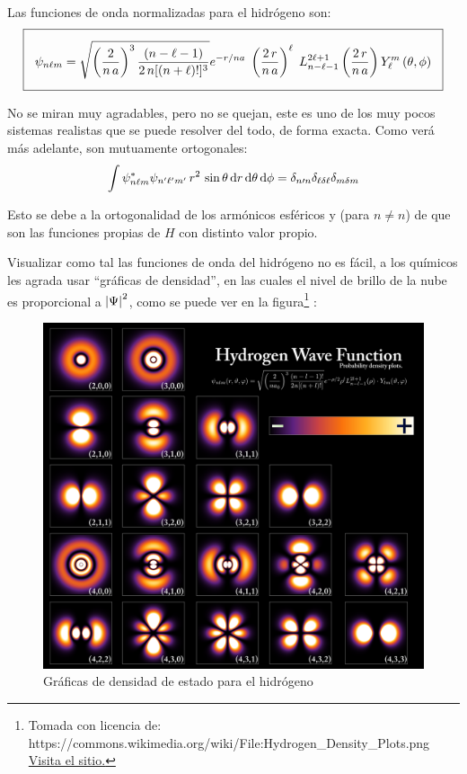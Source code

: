 Las funciones de onda normalizadas para el hidrógeno son:
\begin{align}
\setlength{\fboxsep}{3\fboxsep}\boxed{
\psi_{n \ell m} = \sqrt{\left(\dfrac{2}{n \, a} \right)^{3} \dfrac{(n - \ell - 1)}{2 \, n[(n + \ell)!]^{3}}} e^{-r/na} \; \left( \dfrac{2 \, r}{n \, a} \right)^{\ell} \; L_{n - \ell -1}^{2 \ell + 1} \left( \dfrac{2 \, r}{n \, a} \right) Y_{\ell}^{m} \, (\theta, \phi)}
\label{eq:ecuacion_04_89}
\end{align}

No se miran muy agradables, pero no se quejan, este es uno de los muy pocos sistemas realistas que se puede resolver del todo, de forma exacta. Como verá más adelante, son mutuamente ortogonales:
\begin{align}
\int \psi_{n \ell m}^{*} \psi_{{n}^{\prime} {\ell}^{\prime} {m}^{\prime}} \, r^{2} \, \sin \theta \dd{r} \dd{\theta} \dd{\phi} =  \delta_{n \prime{n}} \delta_{\ell \delta{\ell}} \delta_{m \delta{m}}
\label{eq:ecuacion_04_90}
\end{align}

Esto se debe a la ortogonalidad de los armónicos esféricos y (para $n \neq n$) de que son las funciones propias de $H$ con distinto valor propio.
\par
Visualizar como tal las funciones de onda del hidrógeno no es fácil, a los químicos les agrada usar \enquote{gráficas de densidad}, en las cuales el nivel de brillo de la nube es proporcional a $\abs{\Psi}^{2}$, como se puede ver en la figura\footnote{Tomada con licencia de: https://commons.wikimedia.org/wiki/File:Hydrogen_Density_Plots.png  \href{https://commons.wikimedia.org/wiki/File:Hydrogen_Density_Plots.png}{Visita el sitio.}} :
\begin{figure}[H]
    \centering
    \includegraphics[scale=0.15]{Imagenes/Hydrogen_Density_Plots.png}
    \caption{Gráficas de densidad de estado para el hidrógeno}
\end{figure}

